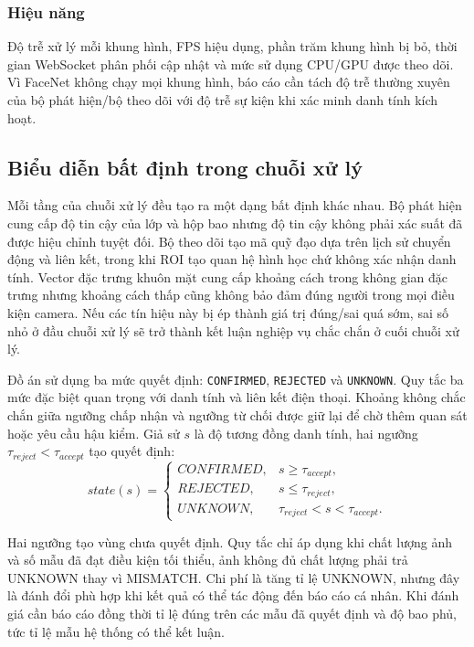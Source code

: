 \subsubsection{Hiệu năng}
Độ trễ xử lý mỗi khung hình, FPS hiệu dụng, phần trăm khung hình bị bỏ, thời gian WebSocket phân phối cập nhật và mức sử dụng CPU/GPU được theo dõi. Vì FaceNet không chạy mọi khung hình, báo cáo cần tách độ trễ thường xuyên của bộ phát hiện/bộ theo dõi với độ trễ sự kiện khi xác minh danh tính kích hoạt.

\subsection{Biểu diễn bất định trong chuỗi xử lý}
Mỗi tầng của chuỗi xử lý đều tạo ra một dạng bất định khác nhau. Bộ phát hiện cung cấp độ tin cậy của lớp và hộp bao nhưng độ tin cậy không phải xác suất đã được hiệu chỉnh tuyệt đối. Bộ theo dõi tạo mã quỹ đạo dựa trên lịch sử chuyển động và liên kết, trong khi ROI tạo quan hệ hình học chứ không xác nhận danh tính. Vector đặc trưng khuôn mặt cung cấp khoảng cách trong không gian đặc trưng nhưng khoảng cách thấp cũng không bảo đảm đúng người trong mọi điều kiện camera. Nếu các tín hiệu này bị ép thành giá trị đúng/sai quá sớm, sai số nhỏ ở đầu chuỗi xử lý sẽ trở thành kết luận nghiệp vụ chắc chắn ở cuối chuỗi xử lý.

Đồ án sử dụng ba mức quyết định: \texttt{CONFIRMED}, \texttt{REJECTED} và \texttt{UNKNOWN}. Quy tắc ba mức đặc biệt quan trọng với danh tính và liên kết điện thoại. Khoảng không chắc chắn giữa ngưỡng chấp nhận và ngưỡng từ chối được giữ lại để chờ thêm quan sát hoặc yêu cầu hậu kiểm. Giả sử $s$ là độ tương đồng danh tính, hai ngưỡng $\tau_{reject}<\tau_{accept}$ tạo quyết định:
\begin{equation}
 state(s)=
 \begin{cases}
 CONFIRMED, & s\geq \tau_{accept},\\
 REJECTED, & s\leq \tau_{reject},\\
 UNKNOWN, & \tau_{reject}<s<\tau_{accept}.
 \end{cases}
\end{equation}

Hai ngưỡng tạo vùng chưa quyết định. Quy tắc chỉ áp dụng khi chất lượng ảnh và số mẫu đã đạt điều kiện tối thiểu, ảnh không đủ chất lượng phải trả UNKNOWN thay vì MISMATCH. Chi phí là tăng tỉ lệ UNKNOWN, nhưng đây là đánh đổi phù hợp khi kết quả có thể tác động đến báo cáo cá nhân. Khi đánh giá cần báo cáo đồng thời tỉ lệ đúng trên các mẫu đã quyết định và độ bao phủ, tức tỉ lệ mẫu hệ thống có thể kết luận.

